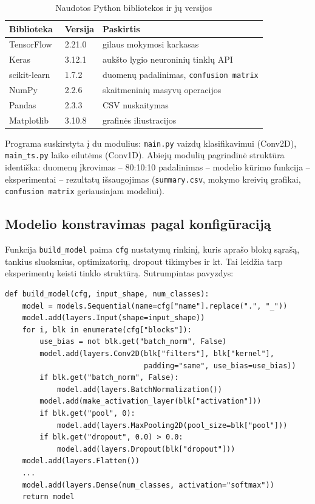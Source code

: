 \documentclass[]{VUMIFTemplateClass}
\begin{document}
\begin{table}[H]
    \centering
    \caption{Naudotos Python bibliotekos ir jų versijos}
    \label{tab:libs}
    \begin{tabular}{|l|l|l|}
        \hline
        \textbf{Biblioteka} & \textbf{Versija} & \textbf{Paskirtis}\\
        \hline
        TensorFlow~\cite{tensorflow}   & 2.21.0  & gilaus mokymosi karkasas\\
        Keras~\cite{keras_docs}        & 3.12.1  & aukšto lygio neuroninių tinklų API\\
        scikit-learn~\cite{sklearn}    & 1.7.2   & duomenų padalinimas, \texttt{confusion matrix}\\
        NumPy                          & 2.2.6   & skaitmeninių masyvų operacijos\\
        Pandas                         & 2.3.3   & CSV nuskaitymas\\
        Matplotlib                     & 3.10.8  & grafinės iliustracijos\\
        \hline
    \end{tabular}
\end{table}

Programa suskirstyta į du modulius: \texttt{main.py} vaizdų klasifikavimui (Conv2D), \texttt{main\_ts.py} laiko eilutėms (Conv1D). Abiejų modulių pagrindinė struktūra identiška: duomenų įkrovimas -- 80:10:10 padalinimas -- modelio kūrimo funkcija -- eksperimentai -- rezultatų išsaugojimas (\texttt{summary.csv}, mokymo kreivių grafikai, \texttt{confusion matrix} geriausiajam modeliui).

\subsection{Modelio konstravimas pagal konfigūraciją}

Funkcija \texttt{build\_model} paima \texttt{cfg} nustatymų rinkinį, kuris aprašo blokų sąrašą, tankius sluoksnius, optimizatorių, dropout tikimybes ir kt. Tai leidžia tarp eksperimentų keisti tinklo struktūrą. Sutrumpintas pavyzdys:

\begin{verbatim}
def build_model(cfg, input_shape, num_classes):
    model = models.Sequential(name=cfg["name"].replace(".", "_"))
    model.add(layers.Input(shape=input_shape))
    for i, blk in enumerate(cfg["blocks"]):
        use_bias = not blk.get("batch_norm", False)
        model.add(layers.Conv2D(blk["filters"], blk["kernel"],
                                padding="same", use_bias=use_bias))
        if blk.get("batch_norm", False):
            model.add(layers.BatchNormalization())
        model.add(make_activation_layer(blk["activation"]))
        if blk.get("pool", 0):
            model.add(layers.MaxPooling2D(pool_size=blk["pool"]))
        if blk.get("dropout", 0.0) > 0.0:
            model.add(layers.Dropout(blk["dropout"]))
    model.add(layers.Flatten())
    ...
    model.add(layers.Dense(num_classes, activation="softmax"))
    return model
\end{verbatim}
\end{document}

